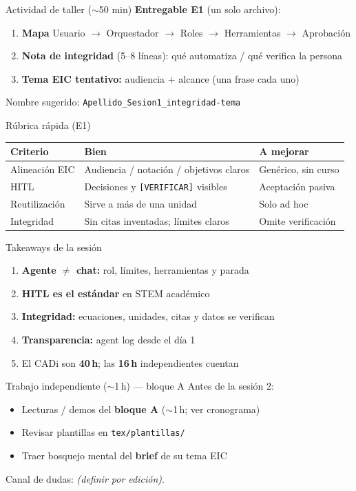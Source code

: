 \documentclass[aspectratio=169,11pt]{beamer}
\begin{document}
\begin{frame}{Actividad de taller ($\sim$50 min)}
\textbf{Entregable E1} (un solo archivo):
\begin{enumerate}
\item \textbf{Mapa} Usuario $\rightarrow$ Orquestador $\rightarrow$ Roles $\rightarrow$ Herramientas $\rightarrow$ Aprobación
\item \textbf{Nota de integridad} (5--8 líneas): qué automatiza / qué verifica la persona
\item \textbf{Tema EIC tentativo:} audiencia + alcance (una frase cada uno)
\end{enumerate}
Nombre sugerido: \texttt{Apellido\_Sesion1\_integridad-tema}
\end{frame}

\begin{frame}{Rúbrica rápida (E1)}
\begin{tabularx}{\textwidth}{@{}lXX@{}}
\toprule
Criterio & Bien & A mejorar \\
\midrule
Alineación EIC & Audiencia / notación / objetivos claros & Genérico, sin curso \\
HITL & Decisiones y \texttt{[VERIFICAR]} visibles & Aceptación pasiva \\
Reutilización & Sirve a más de una unidad & Solo ad hoc \\
Integridad & Sin citas inventadas; límites claros & Omite verificación \\
\bottomrule
\end{tabularx}
\end{frame}

\begin{frame}{Takeaways de la sesión}
\begin{enumerate}
\item \textbf{Agente $\neq$ chat:} rol, límites, herramientas y parada
\item \textbf{HITL es el estándar} en STEM académico
\item \textbf{Integridad:} ecuaciones, unidades, citas y datos se verifican
\item \textbf{Transparencia:} agent log desde el día 1
\item El CADi son \textbf{40\,h}; las \textbf{16\,h} independientes cuentan
\end{enumerate}
\end{frame}

\begin{frame}{Trabajo independiente ($\sim$1\,h) --- bloque A}
Antes de la sesión 2:
\begin{itemize}
\item Lecturas / demos del \textbf{bloque A} ($\sim$1\,h; ver cronograma)
\item Revisar plantillas en \texttt{tex/plantillas/}
\item Traer bosquejo mental del \textbf{brief} de su tema EIC
\end{itemize}
Canal de dudas: \emph{(definir por edición)}.
\end{frame}
\end{document}
